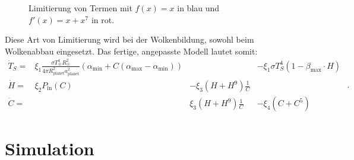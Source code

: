 \begin{refsection}
\begin{figure}[!h]
	\caption{Limitierung von Termen mit $f(x) = x$ in blau und $f'(x) = x + x^7$ in rot.}
	\label{planeten:limit_graph}
\end{figure}
Diese Art von Limitierung wird bei der Wolkenbildung, sowohl beim Wolkenabbau eingesetzt. Das fertige, angepasste Modell lautet somit:
\begin{equation}
\begin{matrix}
\dot{T}_S = & \xi_1 \frac{\sigma T_{\astrosun}^4 R_{\astrosun}^2}{4 \pi R_{\text{planet}}^2 a_{\text{planet}}^2} (\alpha_{\text{min}} + C(\alpha_{\text{max}} - \alpha_{\text{min}})) && - \xi_1 \sigma T_{S}^4  (1 - \beta_{\text{max}} \cdot H)\\
\dot{H}   = & \xi_2 P_{\text{in}}(C) & - \xi_3 (H + H^9) \frac{1}{C}   &                   \\
\dot{C}   = &                        &   \xi_3 (H + H^9) \frac{1}{C}   & - \xi_4 (C + C^5)
\end{matrix} \text{ .}
\end{equation}

\section{Simulation}


\end{refsection}
